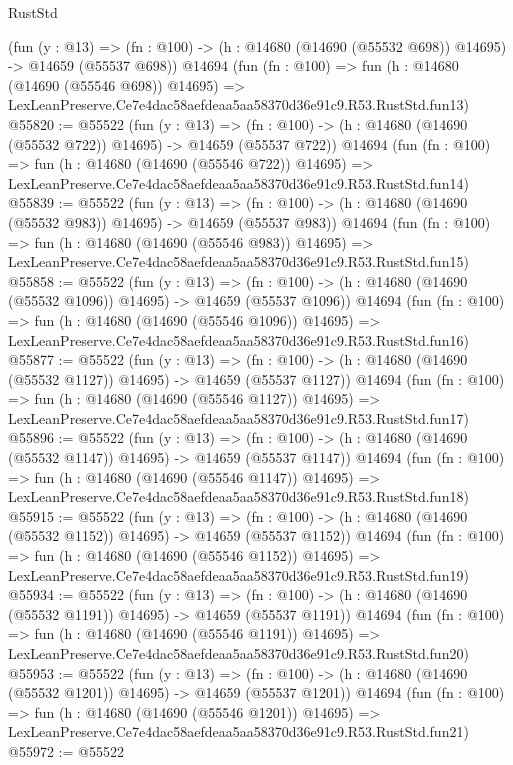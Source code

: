 \begin{lexlean}{RustStd}
\begin{coremodule}
    (fun (y : @13) =>
    (fn : @100) -> (h : @14680 (@14690 (@55532 @698)) @14695) -> @14659 (@55537 @698))
    @14694
    (fun (fn : @100) =>
    fun (h : @14680 (@14690 (@55546 @698)) @14695) =>
    LexLeanPreserve.Ce7e4dac58aefdeaa5aa58370d36e91c9.R53.RustStd.fun13)
@55820 := @55522
    (fun (y : @13) =>
    (fn : @100) -> (h : @14680 (@14690 (@55532 @722)) @14695) -> @14659 (@55537 @722))
    @14694
    (fun (fn : @100) =>
    fun (h : @14680 (@14690 (@55546 @722)) @14695) =>
    LexLeanPreserve.Ce7e4dac58aefdeaa5aa58370d36e91c9.R53.RustStd.fun14)
@55839 := @55522
    (fun (y : @13) =>
    (fn : @100) -> (h : @14680 (@14690 (@55532 @983)) @14695) -> @14659 (@55537 @983))
    @14694
    (fun (fn : @100) =>
    fun (h : @14680 (@14690 (@55546 @983)) @14695) =>
    LexLeanPreserve.Ce7e4dac58aefdeaa5aa58370d36e91c9.R53.RustStd.fun15)
@55858 := @55522
    (fun (y : @13) =>
    (fn : @100) -> (h : @14680 (@14690 (@55532 @1096)) @14695) -> @14659 (@55537 @1096))
    @14694
    (fun (fn : @100) =>
    fun (h : @14680 (@14690 (@55546 @1096)) @14695) =>
    LexLeanPreserve.Ce7e4dac58aefdeaa5aa58370d36e91c9.R53.RustStd.fun16)
@55877 := @55522
    (fun (y : @13) =>
    (fn : @100) -> (h : @14680 (@14690 (@55532 @1127)) @14695) -> @14659 (@55537 @1127))
    @14694
    (fun (fn : @100) =>
    fun (h : @14680 (@14690 (@55546 @1127)) @14695) =>
    LexLeanPreserve.Ce7e4dac58aefdeaa5aa58370d36e91c9.R53.RustStd.fun17)
@55896 := @55522
    (fun (y : @13) =>
    (fn : @100) -> (h : @14680 (@14690 (@55532 @1147)) @14695) -> @14659 (@55537 @1147))
    @14694
    (fun (fn : @100) =>
    fun (h : @14680 (@14690 (@55546 @1147)) @14695) =>
    LexLeanPreserve.Ce7e4dac58aefdeaa5aa58370d36e91c9.R53.RustStd.fun18)
@55915 := @55522
    (fun (y : @13) =>
    (fn : @100) -> (h : @14680 (@14690 (@55532 @1152)) @14695) -> @14659 (@55537 @1152))
    @14694
    (fun (fn : @100) =>
    fun (h : @14680 (@14690 (@55546 @1152)) @14695) =>
    LexLeanPreserve.Ce7e4dac58aefdeaa5aa58370d36e91c9.R53.RustStd.fun19)
@55934 := @55522
    (fun (y : @13) =>
    (fn : @100) -> (h : @14680 (@14690 (@55532 @1191)) @14695) -> @14659 (@55537 @1191))
    @14694
    (fun (fn : @100) =>
    fun (h : @14680 (@14690 (@55546 @1191)) @14695) =>
    LexLeanPreserve.Ce7e4dac58aefdeaa5aa58370d36e91c9.R53.RustStd.fun20)
@55953 := @55522
    (fun (y : @13) =>
    (fn : @100) -> (h : @14680 (@14690 (@55532 @1201)) @14695) -> @14659 (@55537 @1201))
    @14694
    (fun (fn : @100) =>
    fun (h : @14680 (@14690 (@55546 @1201)) @14695) =>
    LexLeanPreserve.Ce7e4dac58aefdeaa5aa58370d36e91c9.R53.RustStd.fun21)
@55972 := @55522

\end{coremodule}
\end{lexlean}
